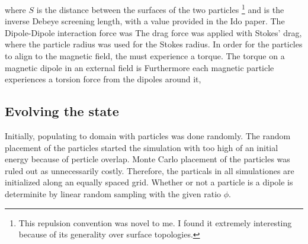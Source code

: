 where $S$ is the distance between the surfaces of the two particles
\footnote{This repulsion convention was novel to me.  I found it
  extremely interesting because of its generality over surface
  topologies.} and is the inverse Debeye screening length, with a
value provided in the Ido paper\cite{1}. The Dipole-Dipole interaction force
was
The drag force was applied with Stokes' drag,
where the particle radius was used for the Stokes radius. In order for
the particles to align to the magnetic field, the must experience a
torque.  The torque on a magnetic dipole in an external field is
Furthermore each magnetic particle experiences a torsion force from
the dipoles around it,


\subsection*{Evolving the state}

Initially, populating to domain with particles was done randomly.  The
random placement of the particles started the simulation with too high
of an initial energy because of perticle overlap.  Monte Carlo
placement of the particles was ruled out as unnecessarily costly.
Therefore, the particals in all simulationes are initialized along an
equally spaced grid. Whether or not a particle is a dipole is
determinite by linear random sampling with the given ratio $\phi$.


